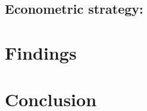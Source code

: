 \documentclass[a4paper,12pt]{article}
\theoremstyle{plain}
\theoremstyle{definition}
\theoremstyle{definition}
\theoremstyle{definition}
\theoremstyle{definition}
\begin{document}
\subsection{Econometric strategy:}
\label{sub:econometric_strategy}



\section{Findings}
\label{sec:findings}

\label{sec:simulation}

\label{sec:climate_model_input}

\label{sec:predictions}

\label{sec:discussion}

\section{Conclusion}
\label{sec:conclusion}



\newpage
\small



\newpage
\appendix
\end{document}
